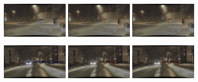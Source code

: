 \documentclass[report.tex]{subfiles}
\begin{document}
\begin{figure}[h!]
        \includegraphics[width=0.3\textwidth]{images/results/mtdetr/samples/night_dense_fog/2018-02-07_18-26-13_00240_gt.png}
        \includegraphics[width=0.3\textwidth]{images/results/mtdetr/samples/night_dense_fog/2018-02-07_18-26-13_00240_m_clr.png}
        \includegraphics[width=0.3\textwidth]{images/results/mtdetr/samples/night_dense_fog/2018-02-07_18-26-13_00240_t_clr.png}
      
        \includegraphics[width=0.3\textwidth]{images/results/mtdetr/samples/night_snow/2018-02-08_17-45-07_00270_gt.png}
        \includegraphics[width=0.3\textwidth]{images/results/mtdetr/samples/night_snow/2018-02-08_17-45-07_00270_m_clr.png}
        \includegraphics[width=0.3\textwidth]{images/results/mtdetr/samples/night_snow/2018-02-08_17-45-07_00270_t_clr.png}
      

\end{figure}
\end{document}
